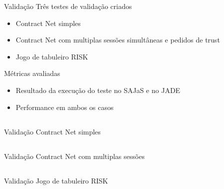 
\begin{frame}{Validação}
	Três testes de validação criados
	\begin{itemize}
		\item Contract Net simples
		\item Contract Net com multiplas sessões simultâneas e pedidos de trust
		\item Jogo de tabuleiro RISK
	\end{itemize}

	Métricas avaliadas
	\begin{itemize}
		\item Resultado da execução do teste no SAJaS e no JADE
		\item Performance em ambos os casos
	\end{itemize}
\end{frame}

\subsection{}
\begin{frame}{Validação}
	Contract Net simples

\end{frame}

\subsection{}
\begin{frame}{Validação}
	Contract Net com multiplas sessões

\end{frame}

\subsection{}
\begin{frame}{Validação}
	Jogo de tabuleiro RISK

\end{frame}

